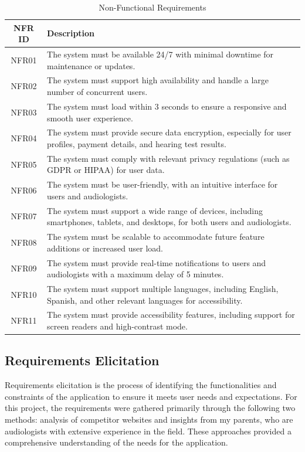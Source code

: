 \documentclass{article}
\begin{document}
\begin{table}[h]
    \centering
    \begin{tabularx}{\textwidth}{|c|X|}
        \hline
        \textbf{NFR ID} & \textbf{Description} \\
        \hline
        NFR01 & The system must be available 24/7 with minimal downtime for maintenance or updates. \\
        \hline
        NFR02 & The system must support high availability and handle a large number of concurrent users. \\
        \hline
        NFR03 & The system must load within 3 seconds to ensure a responsive and smooth user experience. \\
        \hline
        NFR04 & The system must provide secure data encryption, especially for user profiles, payment details, and hearing test results. \\
        \hline
        NFR05 & The system must comply with relevant privacy regulations (such as GDPR or HIPAA) for user data. \\
        \hline
        NFR06 & The system must be user-friendly, with an intuitive interface for users and audiologists. \\
        \hline
        NFR07 & The system must support a wide range of devices, including smartphones, tablets, and desktops, for both users and audiologists. \\
        \hline
        NFR08 & The system must be scalable to accommodate future feature additions or increased user load. \\
        \hline
        NFR09 & The system must provide real-time notifications to users and audiologists with a maximum delay of 5 minutes. \\
        \hline
        NFR10 & The system must support multiple languages, including English, Spanish, and other relevant languages for accessibility. \\
        \hline
        NFR11 & The system must provide accessibility features, including support for screen readers and high-contrast mode. \\
        \hline
    \end{tabularx}
    \caption{Non-Functional Requirements}
\end{table}

\subsection{Requirements Elicitation}
Requirements elicitation is the process of identifying the functionalities and constraints of the application to ensure it meets user needs and expectations. For this project, the requirements were gathered primarily through the following two methods: analysis of competitor websites and insights from my parents, who are audiologists with extensive experience in the field. These approaches provided a comprehensive understanding of the needs for the application.
\end{document}
